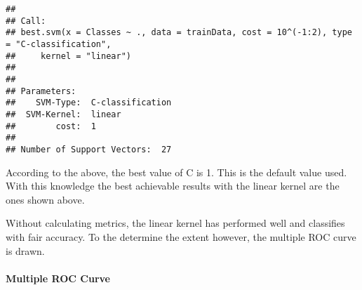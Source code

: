 \documentclass[
]{article}
\begin{document}
\begin{verbatim}
## 
## Call:
## best.svm(x = Classes ~ ., data = trainData, cost = 10^(-1:2), type = "C-classification", 
##     kernel = "linear")
## 
## 
## Parameters:
##    SVM-Type:  C-classification 
##  SVM-Kernel:  linear 
##        cost:  1 
## 
## Number of Support Vectors:  27
\end{verbatim}

According to the above, the best value of C is 1. This is the default
value used. With this knowledge the best achievable results with the
linear kernel are the ones shown above.

Without calculating metrics, the linear kernel has performed well and
classifies with fair accuracy. To the determine the extent however, the
multiple ROC curve is drawn.

\paragraph{Multiple ROC Curve}\label{multiple-roc-curve-8}
\end{document}
